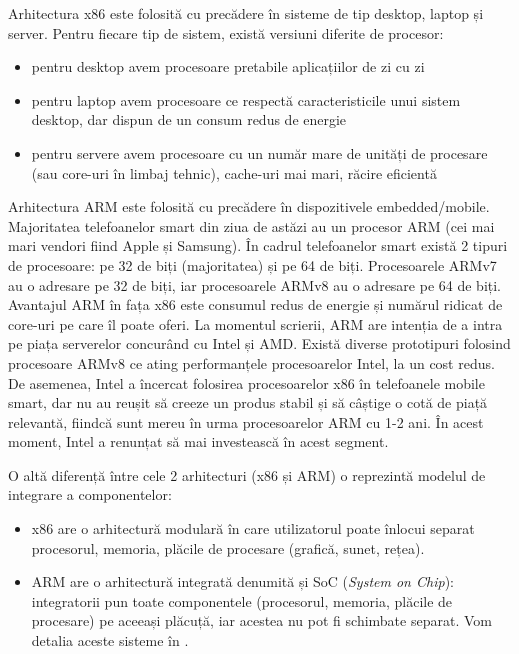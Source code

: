 Arhitectura x86 este folosită cu precădere în sisteme de tip desktop, laptop și
server. Pentru fiecare tip de sistem, există versiuni diferite de procesor:

\begin{itemize}
	\item pentru desktop avem procesoare pretabile aplicațiilor de zi cu zi
	\item pentru laptop avem procesoare ce respectă caracteristicile unui
		sistem desktop, dar dispun de un consum redus de energie
	\item pentru servere avem procesoare cu un număr mare de unități de
		procesare (sau core-uri în limbaj tehnic), cache-uri mai mari,
		răcire eficientă
\end{itemize}

Arhitectura ARM este folosită cu precădere în dispozitivele embedded/mobile.
Majoritatea telefoanelor smart din ziua de astăzi au un procesor ARM (cei mai
mari vendori fiind Apple și Samsung). În cadrul telefoanelor smart există 2
tipuri de procesoare: pe 32 de biți (majoritatea) și pe 64 de biți. Procesoarele
ARMv7 au o adresare pe 32 de biți, iar procesoarele ARMv8 au o adresare pe 64 de
biți. Avantajul ARM în fața x86 este consumul redus de energie și numărul
ridicat de core-uri pe care îl poate oferi. La momentul scrierii, ARM are
intenția de a intra pe piața serverelor concurând cu Intel și AMD. Există
diverse prototipuri folosind procesoare ARMv8 ce ating performanțele
procesoarelor Intel, la un cost redus. De asemenea, Intel a încercat folosirea
procesoarelor x86 în telefoanele mobile smart, dar nu au reușit să creeze un
produs stabil și să câștige o cotă de piață relevantă, fiindcă sunt mereu în
urma procesoarelor ARM cu 1-2 ani. În acest moment, Intel a renunțat să mai
investească în acest segment.

O altă diferență între cele 2 arhitecturi (x86 și ARM) o reprezintă modelul de
integrare a componentelor:

\begin{itemize}
	\item x86 are o arhitectură modulară în care utilizatorul poate înlocui
		separat procesorul, memoria, plăcile de procesare (grafică,
		sunet, rețea).
              \item ARM are o arhitectură integrată denumită și SoC (\textit{System on Chip}):
		integratorii pun toate componentele (procesorul, memoria,
		plăcile de procesare) pe aceeași plăcuță, iar acestea nu pot fi
                schimbate separat. Vom detalia aceste sisteme în .
\end{itemize}


